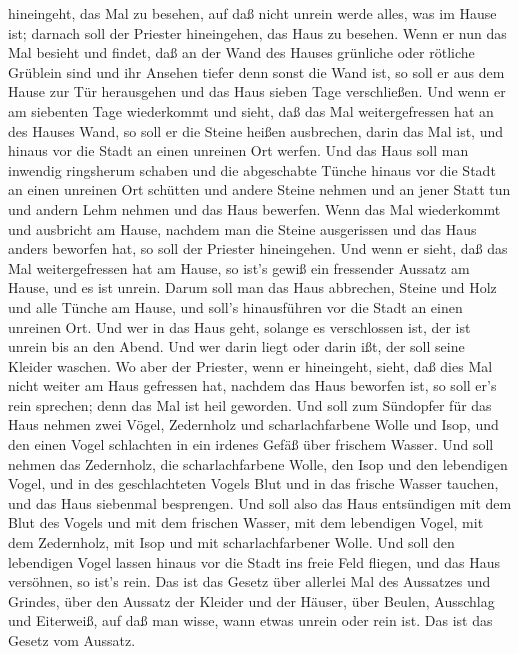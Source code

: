 hineingeht, das Mal zu besehen, auf daß nicht unrein werde alles, was im
Hause ist; darnach soll der Priester hineingehen, das Haus zu besehen.
 Wenn er nun das Mal besieht und findet, daß an der Wand
des Hauses grünliche oder rötliche Grüblein sind und ihr Ansehen tiefer
denn sonst die Wand ist,  so soll er aus dem Hause zur Tür
herausgehen und das Haus sieben Tage verschließen.  Und
wenn er am siebenten Tage wiederkommt und sieht, daß das Mal
weitergefressen hat an des Hauses Wand,  so soll er die
Steine heißen ausbrechen, darin das Mal ist, und hinaus vor die Stadt an
einen unreinen Ort werfen.  Und das Haus soll man inwendig
ringsherum schaben und die abgeschabte Tünche hinaus vor die Stadt an
einen unreinen Ort schütten  und andere Steine nehmen und
an jener Statt tun und andern Lehm nehmen und das Haus bewerfen.
 Wenn das Mal wiederkommt und ausbricht am Hause, nachdem
man die Steine ausgerissen und das Haus anders beworfen hat,
 so soll der Priester hineingehen. Und wenn er sieht, daß
das Mal weitergefressen hat am Hause, so ist's gewiß ein fressender
Aussatz am Hause, und es ist unrein.  Darum soll man das
Haus abbrechen, Steine und Holz und alle Tünche am Hause, und soll's
hinausführen vor die Stadt an einen unreinen Ort.  Und wer
in das Haus geht, solange es verschlossen ist, der ist unrein bis an den
Abend.  Und wer darin liegt oder darin ißt, der soll seine
Kleider waschen.  Wo aber der Priester, wenn er hineingeht,
sieht, daß dies Mal nicht weiter am Haus gefressen hat, nachdem das Haus
beworfen ist, so soll er's rein sprechen; denn das Mal ist heil
geworden.  Und soll zum Sündopfer für das Haus nehmen zwei
Vögel, Zedernholz und scharlachfarbene Wolle und Isop,  und
den einen Vogel schlachten in ein irdenes Gefäß über frischem Wasser.
 Und soll nehmen das Zedernholz, die scharlachfarbene
Wolle, den Isop und den lebendigen Vogel, und in des geschlachteten
Vogels Blut und in das frische Wasser tauchen, und das Haus siebenmal
besprengen.  Und soll also das Haus entsündigen mit dem
Blut des Vogels und mit dem frischen Wasser, mit dem lebendigen Vogel,
mit dem Zedernholz, mit Isop und mit scharlachfarbener Wolle.
 Und soll den lebendigen Vogel lassen hinaus vor die Stadt
ins freie Feld fliegen, und das Haus versöhnen, so ist's rein.
 Das ist das Gesetz über allerlei Mal des Aussatzes und
Grindes,  über den Aussatz der Kleider und der Häuser,
 über Beulen, Ausschlag und Eiterweiß,  auf
daß man wisse, wann etwas unrein oder rein ist. Das ist das Gesetz vom
Aussatz.

